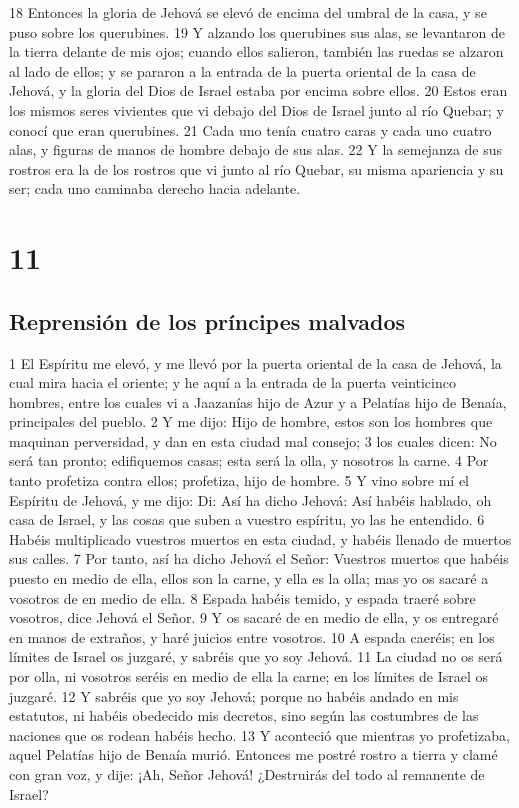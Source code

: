 18 Entonces la gloria de Jehová se elevó de encima del umbral de la casa, y se puso sobre los querubines.
19 Y alzando los querubines sus alas, se levantaron de la tierra delante de mis ojos; cuando ellos salieron, también las ruedas se alzaron al lado de ellos; y se pararon a la entrada de la puerta oriental de la casa de Jehová, y la gloria del Dios de Israel estaba por encima sobre ellos.
20 Estos eran los mismos seres vivientes que vi debajo del Dios de Israel junto al río Quebar; y conocí que eran querubines.
21 Cada uno tenía cuatro caras y cada uno cuatro alas, y figuras de manos de hombre debajo de sus alas.
22 Y la semejanza de sus rostros era la de los rostros que vi junto al río Quebar, su misma apariencia y su ser; cada uno caminaba derecho hacia adelante.

\chapter{11}

\section*{Reprensión de los príncipes malvados}

1 El Espíritu me elevó, y me llevó por la puerta oriental de la casa de Jehová, la cual mira hacia el oriente; y he aquí a la entrada de la puerta veinticinco hombres, entre los cuales vi a Jaazanías hijo de Azur y a Pelatías hijo de Benaía, principales del pueblo.
2 Y me dijo: Hijo de hombre, estos son los hombres que maquinan perversidad, y dan en esta ciudad mal consejo;
3 los cuales dicen: No será tan pronto; edifiquemos casas; esta será la olla, y nosotros la carne.
4 Por tanto profetiza contra ellos; profetiza, hijo de hombre.
5 Y vino sobre mí el Espíritu de Jehová, y me dijo: Di: Así ha dicho Jehová: Así habéis hablado, oh casa de Israel, y las cosas que suben a vuestro espíritu, yo las he entendido.
6 Habéis multiplicado vuestros muertos en esta ciudad, y habéis llenado de muertos sus calles.
7 Por tanto, así ha dicho Jehová el Señor: Vuestros muertos que habéis puesto en medio de ella, ellos son la carne, y ella es la olla; mas yo os sacaré a vosotros de en medio de ella.
8 Espada habéis temido, y espada traeré sobre vosotros, dice Jehová el Señor.
9 Y os sacaré de en medio de ella, y os entregaré en manos de extraños, y haré juicios entre vosotros.
10 A espada caeréis; en los límites de Israel os juzgaré, y sabréis que yo soy Jehová.
11 La ciudad no os será por olla, ni vosotros seréis en medio de ella la carne; en los límites de Israel os juzgaré.
12 Y sabréis que yo soy Jehová; porque no habéis andado en mis estatutos, ni habéis obedecido mis decretos, sino según las costumbres de las naciones que os rodean habéis hecho.
13 Y aconteció que mientras yo profetizaba, aquel Pelatías hijo de Benaía murió. Entonces me postré rostro a tierra y clamé con gran voz, y dije: ¡Ah, Señor Jehová! ¿Destruirás del todo al remanente de Israel?

